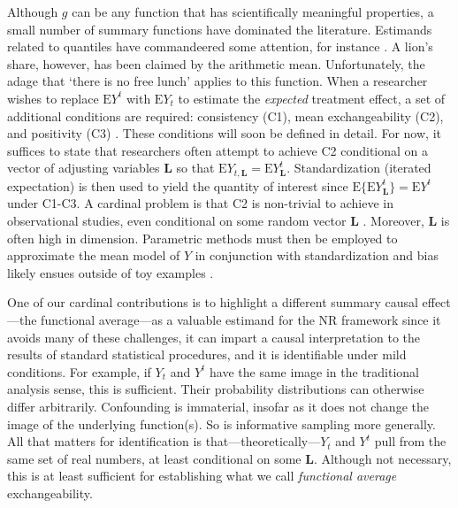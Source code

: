 \documentclass[12pt]{amsart}
\theoremstyle{plain}%
\theoremstyle{definition}
\theoremstyle{remark}
\numberwithin{equation}{section}
\begin{document}
Although $g$ can be any function that has scientifically meaningful properties, a small number of summary functions have dominated the literature. Estimands related to quantiles have commandeered some attention, for instance \cite{jin2008principal, imbens2010rubin, belloni2017program, gangl2010causal}. A lion's share, however, has been claimed by the arithmetic mean. Unfortunately, the adage that `there is no free lunch' applies to this function. When a researcher wishes to replace $\text{E}Y^{t}$ with $\text{E}Y_{t}$ to estimate the \textit{expected} treatment effect, a set of additional conditions are required: consistency (C1), mean exchangeability (C2), and positivity (C3) \cite{cole2009consistency}. These conditions will soon be defined in detail. For now, it suffices to state that researchers often attempt to achieve C2 conditional on a vector of adjusting variables $\mathbf{L}$ so that $\text{E}Y_{t, \mathbf{L}} = \text{E}Y_{\mathbf{L}}^{t}$. Standardization (iterated expectation) is then used to yield the quantity of interest since $\text{E}\{ \text{E} Y_{\mathbf{L}}^t\} = \text{E}Y^t$ under C1-C3.  A cardinal problem is that C2 is non-trivial to achieve in observational studies, even conditional on some random vector $\mathbf{L}$ \cite{hernan2006estimating, greenland1999causal, greenland1999confounding}. Moreover, $\mathbf{L}$ is often high in dimension. Parametric methods must then be employed to approximate the mean model of $Y$ in conjunction with standardization and bias likely ensues outside of toy examples \cite{hernan2010causal}.

One of our cardinal contributions is to highlight a different summary causal effect---the functional average---as a valuable estimand for the NR framework since it avoids many of these challenges, it can impart a causal interpretation to the results of standard statistical procedures, and it is identifiable under mild conditions. For example, if $Y_t$ and $Y^t$ have the same image in the traditional analysis sense, this is sufficient. Their probability distributions can otherwise differ arbitrarily. Confounding is immaterial, insofar as it does not change the image of the underlying function(s). So is informative sampling more generally. All that matters for identification is that---theoretically---$Y_t$ and $Y^t$ pull from the same set of real numbers, at least conditional on some $\mathbf{L}$. Although not necessary, this is at least sufficient for establishing what we call \textit{functional average} exchangeability.
\end{document}
